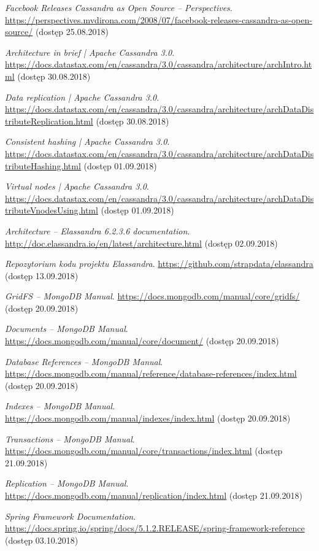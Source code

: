 \begin{thebibliography}{54}

\emph{Facebook Releases Cassandra as Open Source -- Perspectives}.
\url{https://perspectives.mvdirona.com/2008/07/facebook-releases-cassandra-as-open-source/} (dostęp 25.08.2018)

\emph{Architecture in brief | Apache Cassandra 3.0}. 
\url{https://docs.datastax.com/en/cassandra/3.0/cassandra/architecture/archIntro.html} (dostęp 30.08.2018) 

\emph{Data replication | Apache Cassandra 3.0}. 
\url{https://docs.datastax.com/en/cassandra/3.0/cassandra/architecture/archDataDistributeReplication.html} (dostęp 30.08.2018)

\emph{Consistent hashing | Apache Cassandra 3.0}. 
\url{https://docs.datastax.com/en/cassandra/3.0/cassandra/architecture/archDataDistributeHashing.html} (dostęp 01.09.2018)

\emph{Virtual nodes | Apache Cassandra 3.0}. 
\url{https://docs.datastax.com/en/cassandra/3.0/cassandra/architecture/archDataDistributeVnodesUsing.html} (dostęp 01.09.2018)
    
\emph{Architecture -- Elassandra 6.2.3.6 documentation}. 
\url{http://doc.elassandra.io/en/latest/architecture.html} (dostęp 02.09.2018)
    
\emph{Repozytorium kodu projektu Elassandra}.
\url{https://github.com/strapdata/elassandra} (dostęp 13.09.2018)

\emph{GridFS -- MongoDB Manual}. 
\url{https://docs.mongodb.com/manual/core/gridfs/} (dostęp 20.09.2018)

\emph{Documents -- MongoDB Manual}. 
\url{https://docs.mongodb.com/manual/core/document/} (dostęp 20.09.2018)

\emph{Database References -- MongoDB Manual}. 
\url{https://docs.mongodb.com/manual/reference/database-references/index.html} (dostęp 20.09.2018)

\emph{Indexes -- MongoDB Manual}. 
\url{https://docs.mongodb.com/manual/indexes/index.html} (dostęp 20.09.2018)

\emph{Transactions -- MongoDB Manual}. 
\url{https://docs.mongodb.com/manual/core/transactions/index.html} (dostęp 21.09.2018)

\emph{Replication -- MongoDB Manual}. 
\url{https://docs.mongodb.com/manual/replication/index.html} (dostęp 21.09.2018)

\emph{Spring Framework Documentation}. 
\url{https://docs.spring.io/spring/docs/5.1.2.RELEASE/spring-framework-reference} (dostęp 03.10.2018)
    
\end{thebibliography}